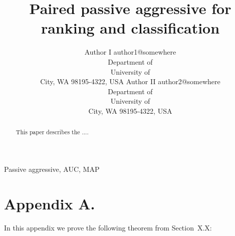 \documentclass[twoside,11pt]{article}
\begin{document}
\title{Paired passive aggressive for ranking and classification}

\author{       \name Author I \email author1@somewhere \\
       \addr Department of \\
       University of \\
       City, WA 98195-4322, USA
       \AND
       \name Author II \email author2@somewhere \\
       \addr Department of \\
       University of \\
       City, WA 98195-4322, USA
       }

\maketitle

\begin{abstract}%
This paper describes the ....
\end{abstract}

\begin{keywords}
  Passive aggressive, AUC, MAP
\end{keywords}












\newpage

\appendix
\section*{Appendix A.}
\label{app:theorem}



In this appendix we prove the following theorem from
Section~X.X:
\end{document}
